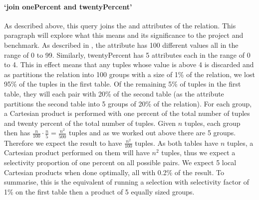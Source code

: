 \paragraph{`join onePercent and twentyPercent'} As described above, this query
joins the  and 
attributes of the  relation. This paragraph will explore
what this means and its significance to the project and benchmark. As described
in , the attribute 
has 100 different values all in the range of 0 to 99. Similarly, twentyPercent
has 5 attributes each in the range of 0 to 4. This in effect means that any
tuples whose  value is above 4 is discarded and as
 partitions the relation into 100 groups with a
size of 1\% of the relation, we lost 95\% of the tuples in the first table. Of
the remaining 5\% of tuples in the first table, they will each pair with 20\% of
the second table (as the attribute  partitions
the second table into 5 groups of 20\% of the relation). For each group, a
Cartesian product is performed with one percent of the total number of tuples
and twenty percent of the total number of tuples. Given $n$ tuples, each group
then has $\frac{n}{100} \cdot \frac{n}{5} = \frac{n^2}{500}$ tuples and as we
worked out above there are 5 groups. Therefore we expect the result to have
$\frac{n^2}{100}$ tuples. As both tables have $n$ tuples, a Cartesian product
performed on them will have $n^2$ tuples, thus we expect a selectivity
proportion of one percent on all possible pairs. We expect 5 local Cartesian
products when done optimally, all with 0.2\% of the result. To summarise, this
is the equivalent of running a selection with selectivity factor of 1\% on the
first table then a product of 5 equally sized groups.
